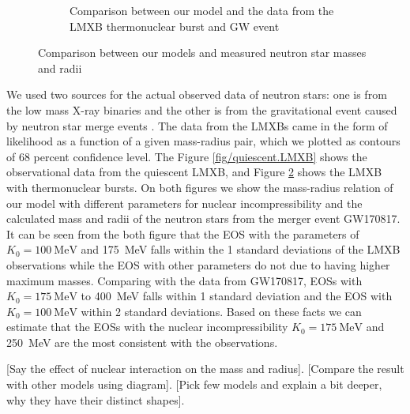 \documentclass[draft,11pt]{article}
\theoremstyle{definition}
\theoremstyle{remark}
\begin{document}
\begin{figure}[h]
\begin{center}
\begin{subfigure}[b]{.49\textwidth}
                    \caption{Comparison between our model and the data from the LMXB thermonuclear burst and GW event}\label{fig/burst.LMXB}
                \end{subfigure}
                \caption{Comparison between our models and measured neutron star masses and radii}
            \end{center}\end{figure}
            
                We used two sources for the actual observed data of neutron stars: one is from the low mass X-ray binaries \parencite{ozel.psaltis.2016/radius.oberve} and the other is from the gravitational event caused by neutron star merge events \cite{ligo.virgo.2019/prop.of.ns.merger.GW170817,ligo.virgo.2018/GW170817.ns.radii}. The data from the LMXBs came in the form of likelihood as a function of a given mass-radius pair, which we plotted as contours of 68 percent confidence level. The Figure \ref{fig/quiescent.LMXB} shows the observational data from the quiescent LMXB, and Figure \ref{fig/burst.LMXB} shows the LMXB with thermonuclear bursts. On both figures we show the mass-radius relation of our model with different parameters for nuclear incompressibility and the calculated mass and radii of the neutron stars from the merger event GW170817. It can be seen from the both figure that the EOS with the parameters of $K_{0}=\SI{100}{\mega\electronvolt}$ and \SI{175}{\mega\electronvolt} falls within the 1 standard deviations of the LMXB observations while the EOS with other parameters do not due to having higher maximum masses. Comparing with the data from GW170817, EOSs with $K_{0}=\SI{175}{\mega\electronvolt}$ to \SI{400}{\mega\electronvolt} falls within 1 standard deviation and the EOS with $K_{0}=\SI{100}{\mega\electronvolt}$ within 2 standard deviations. Based on these facts we can estimate that the EOSs with the nuclear incompressibility $K_{0}=\SI{175}{\mega\electronvolt}$ and \SI{250}{\mega\electronvolt} are the most consistent with the observations.
        
        [Say the effect of nuclear interaction on the mass and radius]. [Compare the result with other models using diagram]. [Pick few models and explain a bit deeper, why they have their distinct shapes].
    
\end{document}
